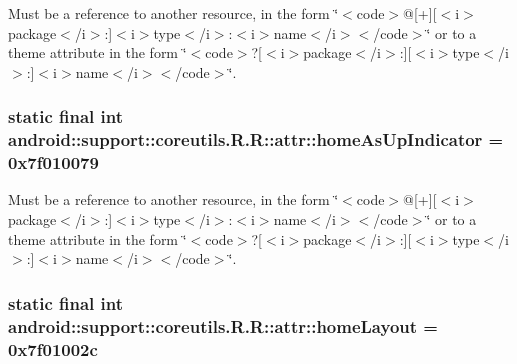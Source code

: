 Must be a reference to another resource, in the form \char`\"{}$<$code$>$@\mbox{[}+\mbox{]}\mbox{[}$<$i$>$package$<$/i$>$:\mbox{]}$<$i$>$type$<$/i$>$:$<$i$>$name$<$/i$>$$<$/code$>$\char`\"{} or to a theme attribute in the form \char`\"{}$<$code$>$?\mbox{[}$<$i$>$package$<$/i$>$:\mbox{]}\mbox{[}$<$i$>$type$<$/i$>$:\mbox{]}$<$i$>$name$<$/i$>$$<$/code$>$\char`\"{}. \hypertarget{classandroid_1_1support_1_1coreutils_1_1_r_1_1attr_e39725b5ec31c295c80034a4ba8bdb52}{
\subsubsection[{homeAsUpIndicator}]{\setlength{\rightskip}{0pt plus 5cm}static final int android::support::coreutils.R.R::attr::homeAsUpIndicator = 0x7f010079}}
\label{classandroid_1_1support_1_1coreutils_1_1_r_1_1attr_e39725b5ec31c295c80034a4ba8bdb52}


Must be a reference to another resource, in the form \char`\"{}$<$code$>$@\mbox{[}+\mbox{]}\mbox{[}$<$i$>$package$<$/i$>$:\mbox{]}$<$i$>$type$<$/i$>$:$<$i$>$name$<$/i$>$$<$/code$>$\char`\"{} or to a theme attribute in the form \char`\"{}$<$code$>$?\mbox{[}$<$i$>$package$<$/i$>$:\mbox{]}\mbox{[}$<$i$>$type$<$/i$>$:\mbox{]}$<$i$>$name$<$/i$>$$<$/code$>$\char`\"{}. \hypertarget{classandroid_1_1support_1_1coreutils_1_1_r_1_1attr_e8117144b602fa5827279751042173d4}{
\subsubsection[{homeLayout}]{\setlength{\rightskip}{0pt plus 5cm}static final int android::support::coreutils.R.R::attr::homeLayout = 0x7f01002c}}
\label{classandroid_1_1support_1_1coreutils_1_1_r_1_1attr_e8117144b602fa5827279751042173d4}


